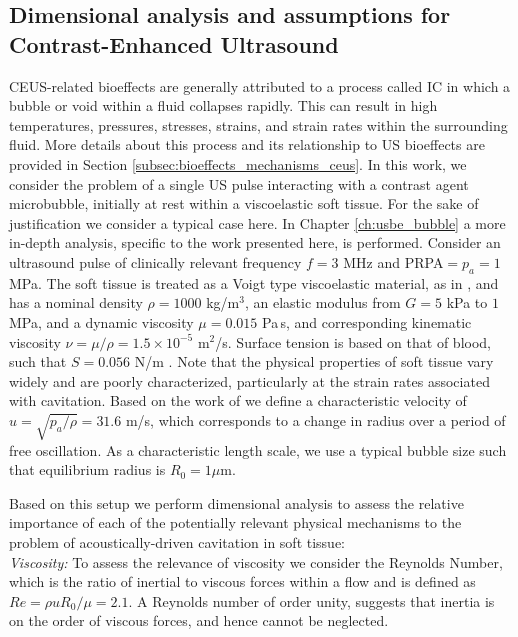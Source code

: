 \subsection{Dimensional analysis and assumptions for Contrast-Enhanced Ultrasound}
\ac{CEUS}-related bioeffects are generally attributed to a process
called \ac{IC} in which a bubble or void within a fluid collapses
rapidly. This can result in high temperatures, pressures, stresses,
strains, and strain rates within the surrounding fluid. More details
about this process and its relationship to \ac{US} bioeffects are
provided in Section \ref{subsec:bioeffects_mechanisms_ceus}. In this
work, we consider the problem of a single \ac{US} pulse interacting
with a contrast agent microbubble, initially at rest within a
viscoelastic soft tissue. For the sake of justification we consider a
typical case here. In Chapter \ref{ch:usbe_bubble} a more in-depth
analysis, specific to the work presented here, is performed. Consider an
ultrasound pulse of clinically relevant frequency $f = 3$ MHz and
\ac{PRPA}$=p_a = 1$ MPa. The soft tissue is treated as a Voigt type
viscoelastic material, as in \cite{Yang2005}, and has a nominal
density $\rho = 1000$ kg/m$^3$, an elastic modulus from $G = 5$ kPa to
$1$ MPa, and a dynamic viscosity $\mu = 0.015$ Pa$\,$s, and
corresponding kinematic viscosity $\nu=\mu/\rho=1.5\times 10^{-5}$
m$^2$/s. Surface tension is based on that of blood, such that
$S = 0.056$ N/m \citep{Apfel1991}. Note that the physical properties
of soft tissue vary widely and are poorly characterized, particularly
at the strain rates associated with cavitation. Based on the work of
\cite{Patterson2012} we define a characteristic velocity of
$u = \sqrt{p_a/\rho} = 31.6$ m/s, which corresponds to a change in
radius over a period of free oscillation. As a characteristic length
scale, we use a typical bubble size such that equilibrium radius is
$R_0 = 1\mu$m.

Based on this setup we perform dimensional analysis to assess the
relative importance of each of the potentially relevant physical
mechanisms to the problem of acoustically-driven cavitation in soft tissue:\\

\noindent\textit{Viscosity:} To assess the relevance of viscosity we
consider the Reynolds Number, which is the ratio of inertial to
viscous forces within a flow and is defined as
$Re = \rho u R_0/\mu=2.1$. A Reynolds number of order unity, suggests
that inertia is on the order
of viscous forces, and hence cannot be neglected.\\

